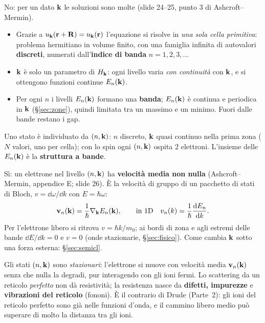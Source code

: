 \documentclass[11pt,a4paper]{article}
\begin{document}
No: per un dato $\mathbf k$ le soluzioni sono molte (slide 24--25, punto 3 di Ashcroft--Mermin).
\begin{itemize}[leftmargin=*]
\item Grazie a $u_{\mathbf k}(\mathbf r+\mathbf R)=u_{\mathbf k}(\mathbf r)$ l'equazione si risolve in \emph{una sola cella primitiva}: problema hermitiano in volume finito, con una famiglia
infinita di autovalori \textbf{discreti}, numerati dall'\textbf{indice di banda} $n=1,2,3,\dots$
\item $\mathbf k$ è solo un parametro di $H_{\mathbf k}$: ogni livello varia \emph{con continuità} con $\mathbf k$, e si ottengono funzioni continue $E_n(\mathbf k)$.
\item Per ogni $n$ i livelli $E_n(\mathbf k)$ formano una \textbf{banda}; $E_n(\mathbf k)$ è continua e periodica in $\mathbf k$ (§\ref{sec:zone}), quindi limitata tra un
massimo e un minimo. Fuori dalle bande restano i gap.
\end{itemize}
\begin{chiave}
Uno stato è individuato da $(n,\mathbf k)$: $n$ discreto, $\mathbf k$ quasi continuo nella prima zona ($N$ valori, uno per cella); con lo spin ogni $(n,\mathbf k)$ ospita 2
elettroni. L'insieme delle $E_n(\mathbf k)$ è la \textbf{struttura a bande}.
\end{chiave}

Sì: un elettrone nel livello $(n,\mathbf k)$ ha \textbf{velocità media non nulla} (Ashcroft--Mermin, appendice E; slide 26). È la velocità di gruppo di un
pacchetto di stati di Bloch, $v=\dd\omega/\dd k$ con $E=\hbar\omega$:
\[
\mathbf v_n(\mathbf k)=\frac1\hbar\nabla_{\mathbf k}E_n(\mathbf k),\qquad\text{in 1D}\quad v_n(k)=\frac1\hbar\frac{\mathrm d E_n}{\mathrm d k}.
\]
Per l'elettrone libero si ritrova $v=\hbar k/m_0$; ai bordi di zona e agli estremi delle bande $\dd E/\dd k=0$ e $v=0$ (onde stazionarie, §\ref{sec:fisico}).
Come cambia $\mathbf k$ sotto una forza esterna: §\ref{sec:semicl}.
\begin{risultato}
Gli stati $(n,\mathbf k)$ sono \emph{stazionari}: l'elettrone si muove con velocità media $\mathbf v_n(\mathbf k)$ senza che nulla la degradi, pur interagendo con gli
ioni fermi. Lo scattering da un reticolo \emph{perfetto} non dà resistività; la resistenza nasce da \textbf{difetti, impurezze} e \textbf{vibrazioni del
reticolo} (fononi). È il contrario di Drude (Parte~2): gli ioni del reticolo perfetto sono già nelle funzioni d'onda, e il cammino libero medio può
superare di molto la distanza tra gli ioni.
\end{risultato}
\end{document}

